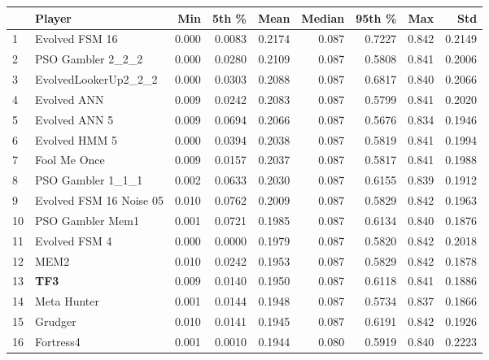 \begin{tabular}{llrrrrrrr}
\toprule
{} &                   Player &    Min &   5th \% &    Mean &  Median &  95th \% &    Max &     Std \\
\midrule
1  &           Evolved FSM 16 &  0.000 &  0.0083 &  0.2174 &   0.087 &  0.7227 &  0.842 &  0.2149 \\
2  &        PSO Gambler 2\_2\_2 &  0.000 &  0.0280 &  0.2109 &   0.087 &  0.5808 &  0.841 &  0.2006 \\
3  &     EvolvedLookerUp2\_2\_2 &  0.000 &  0.0303 &  0.2088 &   0.087 &  0.6817 &  0.840 &  0.2066 \\
4  &              Evolved ANN &  0.009 &  0.0242 &  0.2083 &   0.087 &  0.5799 &  0.841 &  0.2020 \\
5  &            Evolved ANN 5 &  0.009 &  0.0694 &  0.2066 &   0.087 &  0.5676 &  0.834 &  0.1946 \\
6  &            Evolved HMM 5 &  0.000 &  0.0394 &  0.2038 &   0.087 &  0.5819 &  0.841 &  0.1994 \\
7  &             Fool Me Once &  0.009 &  0.0157 &  0.2037 &   0.087 &  0.5817 &  0.841 &  0.1988 \\
8  &        PSO Gambler 1\_1\_1 &  0.002 &  0.0633 &  0.2030 &   0.087 &  0.6155 &  0.839 &  0.1912 \\
9  &  Evolved FSM 16 Noise 05 &  0.010 &  0.0762 &  0.2009 &   0.087 &  0.5829 &  0.842 &  0.1963 \\
10 &         PSO Gambler Mem1 &  0.001 &  0.0721 &  0.1985 &   0.087 &  0.6134 &  0.840 &  0.1876 \\
11 &            Evolved FSM 4 &  0.000 &  0.0000 &  0.1979 &   0.087 &  0.5820 &  0.842 &  0.2018 \\
12 &                     MEM2 &  0.010 &  0.0242 &  0.1953 &   0.087 &  0.5829 &  0.842 &  0.1878 \\
13 &                      \textbf{TF3} &  0.009 &  0.0140 &  0.1950 &   0.087 &  0.6118 &  0.841 &  0.1886 \\
14 &              Meta Hunter &  0.001 &  0.0144 &  0.1948 &   0.087 &  0.5734 &  0.837 &  0.1866 \\
15 &                  Grudger &  0.010 &  0.0141 &  0.1945 &   0.087 &  0.6191 &  0.842 &  0.1926 \\
16 &                Fortress4 &  0.001 &  0.0010 &  0.1944 &   0.080 &  0.5919 &  0.840 &  0.2223 \\
\bottomrule
\end{tabular}
